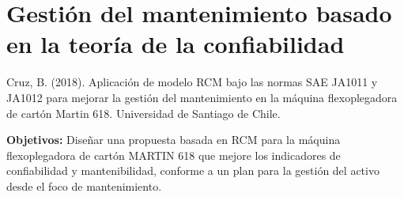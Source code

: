 \section{Gestión del mantenimiento basado en la teoría de la confiabilidad}



Cruz, B. (2018). Aplicación de modelo RCM bajo las normas SAE JA1011 y JA1012 para mejorar la gestión del mantenimiento en la máquina flexoplegadora de cartón Martin 618. Universidad de Santiago de Chile.

\begin{description}
\item \textbf{Objetivos:} Diseñar una propuesta basada en RCM para la máquina flexoplegadora de cartón MARTIN 618 que mejore los indicadores de confiabilidad y mantenibilidad, conforme a un plan para la gestión del activo desde el foco de mantenimiento. 

\end{description}


